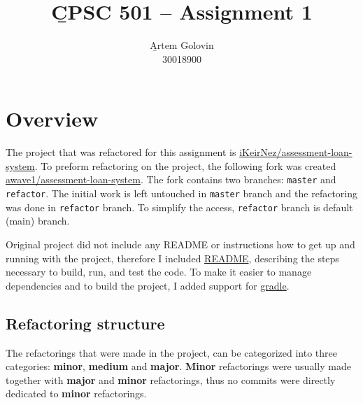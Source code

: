 \documentclass{article}
\title{\b{CPSC 501 -- Assignment 1}}
\author{\b{Artem Golovin} \\ 30018900}
\date{}
\renewcommand{\b}[1]{\textbf{#1}}
\newcommand{\code}[1]{\texttt{#1}}
\begin{document}
\maketitle


\section*{Overview}

The project that was refactored for this assignment is \href{https://github.com/iKeirNez/assessment-loan-system}{iKeirNez/assessment-loan-system}. To preform refactoring on the project, the following fork was created \href{https://github.com/awave1/assessment-loan-system}{awave1/assessment-loan-system}. The fork contains two branches: \code{master} and \code{refactor}. The initial work is left untouched in \code{master} branch and the refactoring was done in \code{refactor} branch. To simplify the access, \code{refactor} branch is default (main) branch.

Original project did not include any README or instructions how to get up and running with the project, therefore I included \href{https://github.com/awave1/assessment-loan-system/blob/refactor/README.md}{README}, describing the steps necessary to build, run, and test the code. To make it easier to manage dependencies and to build the project, I added support for \href{https://gradle.org/}{gradle}.

  \subsection*{Refactoring structure}

  The refactorings that were made in the project, can be categorized into three categories: \b{minor}, \b{medium} and \b{major}. \b{Minor} refactorings were usually made together with \b{major} and \b{minor} refactorings, thus no commits were directly dedicated to \b{minor} refactorings.
\end{document}
